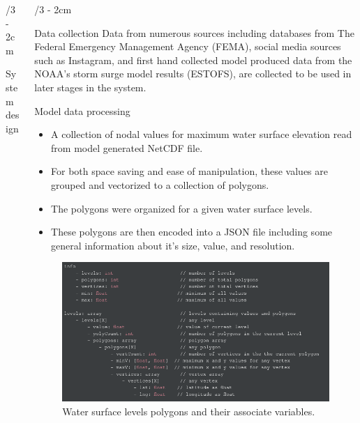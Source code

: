\documentclass[landscape]{uioposter}
\begin{document}
\begin{frame}
\begin{columns}[onlytextwidth]
\begin{column}{\textwidth/3 - 2cm}
\begin{block}{System design}
    
    \end{block}
    
        
\end{column}




\begin{column}{\textwidth/3 - 2cm}
    
    \begin{block}{Data collection}
      Data from numerous sources including databases from The Federal
      Emergency Management Agency (FEMA), social media sources such
      as Instagram, and ﬁrst hand collected model produced data from the
      NOAA's storm surge model results (ESTOFS), are collected to
      be used in later stages in the system.
    \end{block}
    
    
    \begin{block}{Model data processing}
      \begin{itemize}
        \item A collection of nodal values for maximum water surface elevation read from
      model generated NetCDF ﬁle.
      \item For both space saving and ease of manipulation, these values are
      grouped and vectorized to a collection of polygons.
      \item The polygons were organized for a given water surface levels.
      \item These polygons are then encoded into a
      JSON ﬁle including some general information about it’s size, value, and
      resolution.
      \end{itemize}
        
        
      \begin{figure}
         \centering
         \includegraphics[scale=1.1]{screenshot1.png}
         \caption{Water surface levels polygons and their associate
      variables.}   
      \end{figure}




\end{block}
\end{column}
\end{columns}
\end{frame}
\end{document}
